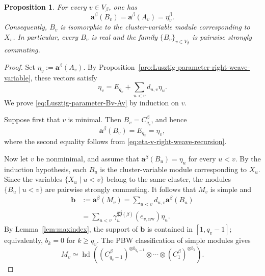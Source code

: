 \documentclass[12pt, reqno]{amsart}
\theoremstyle{plain}
\newtheorem{proposition}[theorem]{Proposition}
\theoremstyle{definition}
\numberwithin{equation}{section}
\begin{document}
\begin{proposition}\label{pro:LusztigparaBv}
For every \(v\in V_\beta\), one has
\begin{equation}\label{eq:Lusztig-parameter-Bv-Av}
    \mathbf a^\beta(B_v)=\mathbf a^\beta(A_v)=\eta^\beta_v.
\end{equation}
Consequently, \(B_v\) is isomorphic to the cluster-variable module
corresponding to \(X_v\). In particular, every \(B_v\) is real and the
family \(\{B_v\}_{v\in V_\beta}\) is pairwise strongly commuting.
\end{proposition}

\begin{proof}
Set \(\eta_v:=\mathbf a^\beta(A_v)\). By
Proposition~\ref{pro:Lusztig-parameter-right-weave-variable}, these
vectors satisfy
\begin{equation}\label{eq:eta-v-right-weave-recursion}
    \eta_v
    =
    E_{q_v}
    +
    \sum_{u<v}d_{u,v}\eta_u.
\end{equation}
We prove \eqref{eq:Lusztig-parameter-Bv-Av} by induction on \(v\).

Suppose first that \(v\) is minimal. Then \(B_v=C_{q_v}^\beta\), and
hence
\begin{equation*}
    \mathbf a^\beta(B_v)=E_{q_v}=\eta_v,
\end{equation*}
where the second equality follows from
\eqref{eq:eta-v-right-weave-recursion}.

Now let \(v\) be nonminimal, and assume that
\(\mathbf a^\beta(B_u)=\eta_u\) for every \(u<v\). By the induction
hypothesis, each \(B_u\) is the cluster-variable module corresponding
to \(X_u\). Since the variables \(\{X_u\mid u<v\}\) belong to the same
cluster, the modules \(\{B_u\mid u<v\}\) are pairwise strongly
commuting. It follows that \(M_v\) is simple and
\begin{align}
    \mathbf b
    &:=
    \mathbf a^\beta(M_v)
    =
    \sum_{u<v}d_{u,v}\mathbf a^\beta(B_u)
    \nonumber\\
    &=
    \sum_{u<v}
    \gamma_u^{\overrightarrow{\mathfrak W}(\beta)}
    (e_{v,\mathrm{nw}})\eta_u.
    \label{eq:Lusztig-parameter-Mv}
\end{align}
By Lemma~\ref{lem:maxindex}, the support of \(\mathbf b\) is contained
in \([1,q_v-1]\); equivalently, \(b_k=0\) for \(k\geq q_v\). The PBW
classification of simple modules gives
\begin{equation}\label{eq:PBW-realization-Mv}
    M_v
    \simeq
    \operatorname{hd}\left(
        (C_{q_v-1}^\beta)^{\otimes b_{q_v-1}}
        \otimes\cdots\otimes
        (C_1^\beta)^{\otimes b_1}
    \right).
\end{equation}


\end{proof}
\end{document}
